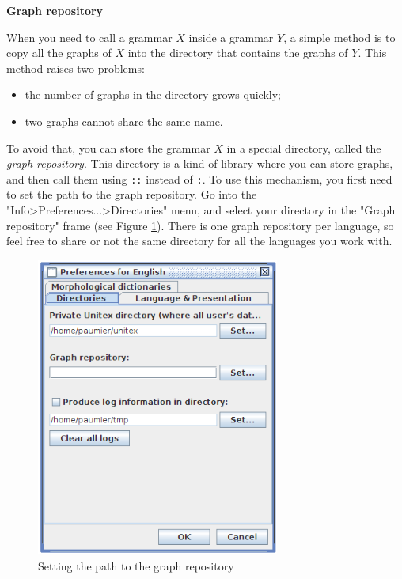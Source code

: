 
\bigskip
\noindent \textbf{Graph repository}
\label{section-repository}

\bigskip
\noindent When you need to call a grammar $X$ inside a grammar $Y$, a simple
method is to copy all the graphs of $X$ into the directory that contains the
graphs of $Y$. This method raises two problems:

\begin{itemize}
  \item the number of graphs in the directory grows quickly;
  \item two graphs cannot share the same name.
\end{itemize}

\bigskip
\noindent To avoid that, you can store the grammar $X$ in a special directory,
called the \textit{graph repository}. This directory is a
kind of library where you can store graphs, and then call them using \verb+::+
instead of \verb+:+. To use this mechanism, you first need to set the path to the
graph repository. Go into the "Info>Preferences...>Directories" menu, and select
your directory in the "Graph repository" frame (see Figure \ref{directories}).
There is one graph repository per language, so feel free to share or not the same
directory for all the languages you work with.

\begin{figure}[!h]
\begin{center}
\includegraphics[width=8cm]{resources/img/fig5-10.png}
\caption{Setting the path to the graph repository\label{directories}}
\end{center}
\end{figure}


